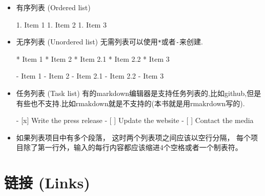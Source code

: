\documentclass[]{ctexbook}
\newenvironment{Shaded}{\begin{snugshade}}{\end{snugshade}}
\newcommand{\NormalTok}[1]{#1}
\newcommand{\SpecialStringTok}[1]{\textcolor[rgb]{0.31,0.60,0.02}{#1}}
\newcommand{\VariableTok}[1]{\textcolor[rgb]{0.00,0.00,0.00}{#1}}
\begin{document}
\begin{itemize}
\item
  有序列表 (Ordered list)

\begin{Shaded}
\begin{Highlighting}[]
\SpecialStringTok{1. }\NormalTok{Item 1}
\SpecialStringTok{1. }\NormalTok{Item 2}
\SpecialStringTok{1. }\NormalTok{Item 3}
\end{Highlighting}
\end{Shaded}
\item
  无序列表 (Unordered list)
  无需列表可以使用\texttt{*}或者\texttt{-}来创建.

\begin{Shaded}
\begin{Highlighting}[]
\SpecialStringTok{* }\NormalTok{Item 1}
\SpecialStringTok{* }\NormalTok{Item 2}
\SpecialStringTok{  * }\NormalTok{Item 2.1}
\SpecialStringTok{  * }\NormalTok{Item 2.2}
\SpecialStringTok{* }\NormalTok{Item 3}
\end{Highlighting}
\end{Shaded}

\begin{Shaded}
\begin{Highlighting}[]
\SpecialStringTok{{-} }\NormalTok{Item 1}
\SpecialStringTok{{-} }\NormalTok{Item 2}
\SpecialStringTok{  {-} }\NormalTok{Item 2.1}
\SpecialStringTok{  {-} }\NormalTok{Item 2.2}
\SpecialStringTok{{-} }\NormalTok{Item 3}
\end{Highlighting}
\end{Shaded}
\item
  任务列表 (Task list)
  有的markdown编辑器是支持任务列表的,比如github,但是有些也不支持.比如rmakdown就是不支持的(本书就是用rmakrdown写的).

\begin{Shaded}
\begin{Highlighting}[]
\SpecialStringTok{{-} }\VariableTok{[x]}\NormalTok{ Write the press release}
\SpecialStringTok{{-} }\VariableTok{[ ]}\NormalTok{ Update the website}
\SpecialStringTok{{-} }\VariableTok{[ ]}\NormalTok{ Contact the media}
\end{Highlighting}
\end{Shaded}
\item
  如果列表项目中有多个段落， 这时两个列表项之间应该以空行分隔， 每个项目除了第一行外，输入的每行内容都应该缩进4个空格或者一个制表符。
\end{itemize}

\hypertarget{ux94feux63a5-links}{%
\section{链接 (Links)}\label{ux94feux63a5-links}}
\end{document}
